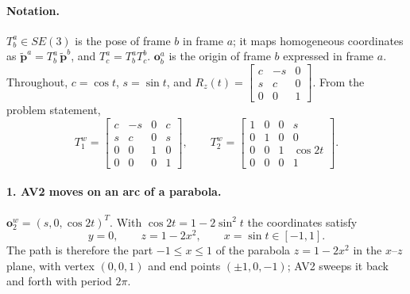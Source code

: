 \documentclass[a4paper]{tufte-handout}
\begin{document}

\paragraph{Notation.}
$T^a_b \in SE(3)$ is the pose of frame $b$ in frame $a$; it maps homogeneous
coordinates as $\tilde{\bm p}^a = T^a_b\,\tilde{\bm p}^b$, and
$T^a_c = T^a_b T^b_c$.
$\bm o_b^a$ is the origin of frame $b$ expressed in frame $a$.
Throughout, $c = \cos t$, $s = \sin t$, and
$R_z(t) = \left[\begin{smallmatrix} c & -s & 0\\ s & c & 0\\ 0 & 0 & 1\end{smallmatrix}\right]$.
From the problem statement,
\begin{equation*}
T^w_1 = \begin{bmatrix} c & -s & 0 & c\\ s & c & 0 & s\\ 0 & 0 & 1 & 0\\ 0 & 0 & 0 & 1 \end{bmatrix},
\qquad
T^w_2 = \begin{bmatrix} 1 & 0 & 0 & s\\ 0 & 1 & 0 & 0\\ 0 & 0 & 1 & \cos 2t\\ 0 & 0 & 0 & 1 \end{bmatrix}.
\end{equation*}

\paragraph{1. AV2 moves on an arc of a parabola.}
$\bm o_2^w = (s, 0, \cos 2t)^T$.
With $\cos 2t = 1 - 2\sin^2 t$ the coordinates satisfy
\begin{equation*}
y = 0, \qquad z = 1 - 2x^2, \qquad x = \sin t \in [-1, 1].
\end{equation*}
The path is therefore the part $-1 \le x \le 1$ of the parabola
$z = 1 - 2x^2$ in the $x$--$z$ plane, with vertex $(0, 0, 1)$ and end points
$(\pm 1, 0, -1)$; AV2 sweeps it back and forth with period $2\pi$.
\end{document}
